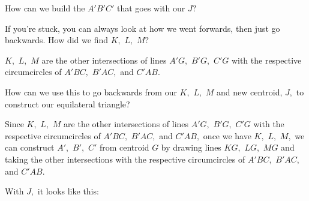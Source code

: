 How can we build the $A'B'C'$ that goes with our $J?$

If you're stuck, you can always look at how we went forwards, then just go backwards. How did we find $K,$ $L,$ $M?$



$K,$ $L,$ $M $ are the other intersections of lines $A'G,$ $B'G,$ $C'G$ with the respective circumcircles of $A'BC,$ $B'AC,$ and $C'AB.$

How can we use this to go backwards from our $K,$ $L,$ $M$ and new centroid, $J,$ to construct our equilateral triangle?





Since $K,$ $L,$ $M$ are the other intersections of lines $A'G,$ $B'G,$ $C'G$ with the respective circumcircles of $A'BC,$ $B'AC,$ and $C'AB,$ once we have $K,$ $L,$ $M,$ we can construct $A',$ $B',$ $C'$ from centroid $G$ by drawing lines $KG,$ $LG,$ $MG $ and taking the other intersections with the respective circumcircles of $A'BC,$ $B'AC,$ and $C'AB.$

With $J,$ it looks like this:




